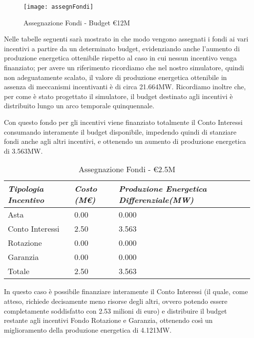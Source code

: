 \begin{figure}[hbt]
	\centering
	\texttt{[image: assegnFondi]}
	\caption{Assegnazione Fondi - Budget \euro12M }
	\label{assegnFondi}
\end{figure}

Nelle tabelle seguenti sarà mostrato in che modo vengono assegnati i fondi ai vari incentivi a partire da un determinato budget, evidenziando anche l'aumento di produzione energetica ottenibile rispetto al caso in cui nessun incentivo venga finanziato; per avere un riferimento ricordiamo che nel nostro simulatore, quindi non adeguatamente scalato, il valore di produzione energetica ottenibile in assenza di meccanismi incentivanti è di circa 21.664MW. Ricordiamo inoltre che, per come è stato progettato il simulatore, il budget destinato agli incentivi è distribuito lungo un arco temporale quinquennale. 


Con questo fondo per gli incentivi viene finanziato totalmente il Conto Interessi consumando interamente il budget disponibile, impedendo quindi di stanziare fondi anche agli altri incentivi, e ottenendo un aumento di produzione energetica di 3.563MW.

\begin{table}[h]
\centering
	\begin{tabular}{ p{}  | p{} | p{}  }
		\hline \hline 
		\nohyphens{\emph{Tipologia Incentivo}} & \nohyphens{\emph{Costo (M\euro)}} & \nohyphens{\emph{Produzione Energetica Differenziale(MW)}} \\ \hline
		Asta &  0.00 & 0.000 \\ 
		Conto Interessi & 2.50 & 3.563 \\ 
		Rotazione & 0.00 & 0.000 \\ 
		Garanzia & 0.00 & 0.000 \\ \hline 
		Totale & 2.50 & 3.563 \\
		\hline \hline 
	\end{tabular}
	\caption{Assegnazione Fondi - \euro2.5M}
	\label{tab:assegnFondi2M}	
\end{table}


In questo caso è possibile finanziare interamente il Conto Interessi (il quale, come atteso, richiede decisamente meno risorse degli altri, ovvero potendo essere completamente soddisfatto con 2.53 milioni di euro) e distribuire il budget restante agli incentivi Fondo Rotazione e Garanzia, ottenendo così un miglioramento della produzione energetica di 4.121MW.

